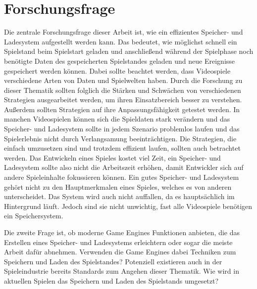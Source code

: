 \section{Forschungsfrage}
Die zentrale Forschungsfrage dieser Arbeit ist, wie ein effizientes Speicher- und Ladesystem aufgestellt werden kann. Das bedeutet, wie möglichst schnell ein Spielstand beim Spielstart geladen und anschließend während der Spielphase noch benötigte Daten des gespeicherten Spielstandes geladen und neue Ereignisse gespeichert werden können. Dabei sollte beachtet werden, dass Videospiele verschiedene Arten von Daten und Spielwelten haben. Durch die Forschung zu dieser Thematik sollten folglich die Stärken und Schwächen von verschiedenen Strategien ausgearbeitet werden, um ihren Einsatzbereich besser zu verstehen. Außerdem sollten Strategien auf ihre Anpassungsfähigkeit getestet werden. In manchen Videospielen können sich die Spieldaten stark verändern und das Speicher- und Ladesystem sollte in jedem Szenario problemlos laufen und das Spielerlebnis nicht durch Verlangsamung beeinträchtigen. Die Strategien, die einfach umzusetzen sind und trotzdem effizient laufen, sollten auch betrachtet werden. Das Entwickeln eines Spieles kostet viel Zeit, ein Speicher- und Ladesystem sollte also nicht die Arbeitszeit erhöhen, damit Entwickler sich auf andere Spieleinhalte fokussieren können. Ein gutes Speicher- und Ladesystem gehört nicht zu den Hauptmerkmalen eines Spieles, welches es von anderen unterscheidet. Das System wird auch nicht auffallen, da es hauptsächlich im Hintergrund läuft. Jedoch sind sie nicht unwichtig, fast alle Videospiele benötigen ein Speichersystem.  

Die zweite Frage ist, ob moderne Game Engines Funktionen anbieten, die das Erstellen eines Speicher- und Ladesystems erleichtern oder sogar die meiste Arbeit dafür abnehmen. Verwenden die Game Engines dabei Techniken zum Speichern und Laden des Spielstandes? Potenziell existieren auch in der Spieleindustrie bereits Standards zum Angehen dieser Thematik. Wie wird in aktuellen Spielen das Speichern und Laden des Spielstands umgesetzt?
